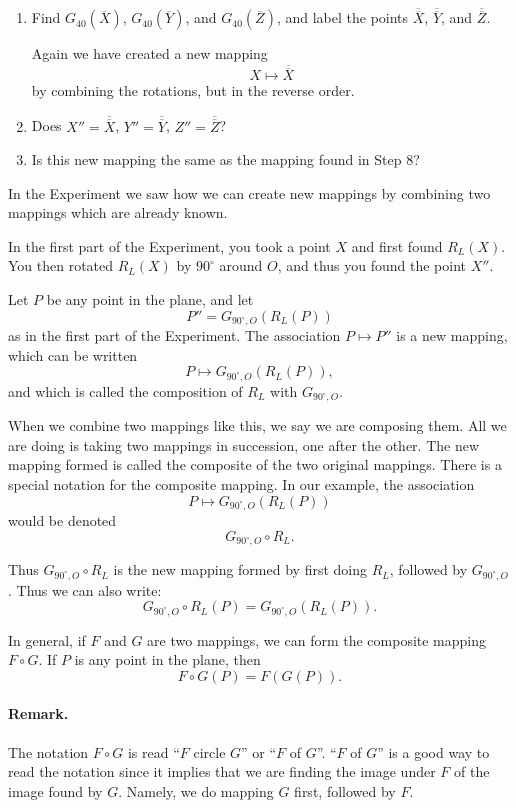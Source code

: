 \documentclass[12pt]{book} %
\begin{document}
\begin{ExerciseList}
\begin{enumerate}
\item Find $G_{40}(\overline{X})$, $G_{40}(\overline{Y})$, and $G_{40}(\overline{Z})$, and label the points $\overline{\overline{X}}$, $\overline{\overline{Y}}$, and $\overline{\overline{Z}}$.

Again we have created a new mapping
\[
X\longmapsto \overline{\overline{X}}
\]
by combining the rotations, but in the reverse order.

\item Does $X''=\overline{\overline{X}}$, $Y''=\overline{\overline{Y}}$, $Z''=\overline{\overline{Z}}$?

\item Is this new mapping the same as the mapping found in Step 8?
\end{enumerate}

In the Experiment we saw how we can create new mappings by combining two mappings which are already known.

In the first part of the Experiment, you took a point $X$ and first found $R_L(X)$. You then rotated $R_L(X)$ by $90^\circ$ around $O$, and thus you found the point $X''$.

Let $P$ be any point in the plane, and let
\[
P''=G_{90^\circ,O}(R_L(P))
\]
as in the first part of the Experiment. The association $P\mapsto P''$ is a new mapping, which can be written
\[
P\longmapsto G_{90^\circ,O}(R_L(P)),
\]
and which is called the composition of $R_L$ with $G_{90^\circ,O}$.

When we combine two mappings like this, we say we are composing them. All we are doing is taking two mappings in succession, one after the other. The new mapping formed is called the composite of the two original mappings. There is a special notation for the composite mapping. In our example, the association
\[
P\longmapsto G_{90^\circ,O}(R_L(P))
\]
would be denoted
\[
G_{90^\circ,O}\circ R_L.
\]

Thus $G_{90^\circ,O}\circ R_L$ is the new mapping formed by first doing $R_L$, followed by $G_{90^\circ,O}$. Thus we can also write:
\[
G_{90^\circ,O}\circ R_L(P)=G_{90^\circ,O}(R_L(P)).
\]

In general, if $F$ and $G$ are two mappings, we can form the composite mapping $F\circ G$. If $P$ is any point in the plane, then
\[
F\circ G(P)=F(G(P)).
\]

\paragraph{Remark.}
The notation $F\circ G$ is read ``$F$ circle $G$'' or ``$F$ of $G$''. ``$F$ of $G$'' is a good way to read the notation since it implies that we are finding the image under $F$ of the image found by $G$. Namely, we do mapping $G$ first, followed by $F$.


\end{ExerciseList}
\end{document}
